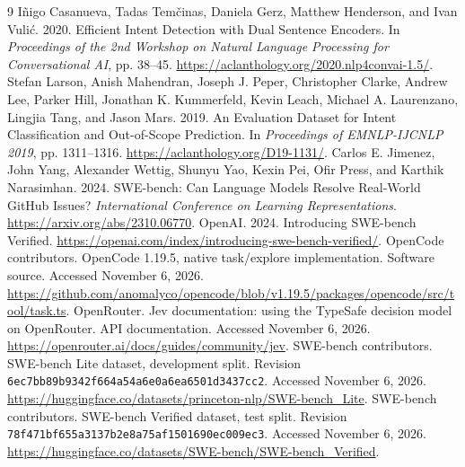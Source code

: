\documentclass{article}
\begin{document}
\clearpage
\begin{thebibliography}{9}
I\~nigo Casanueva, Tadas Tem\v{c}inas, Daniela Gerz, Matthew Henderson, and Ivan Vuli\'c. 2020. Efficient Intent Detection with Dual Sentence Encoders. In \emph{Proceedings of the 2nd Workshop on Natural Language Processing for Conversational AI}, pp. 38--45. \url{https://aclanthology.org/2020.nlp4convai-1.5/}.
Stefan Larson, Anish Mahendran, Joseph J. Peper, Christopher Clarke, Andrew Lee, Parker Hill, Jonathan K. Kummerfeld, Kevin Leach, Michael A. Laurenzano, Lingjia Tang, and Jason Mars. 2019. An Evaluation Dataset for Intent Classification and Out-of-Scope Prediction. In \emph{Proceedings of EMNLP-IJCNLP 2019}, pp. 1311--1316. \url{https://aclanthology.org/D19-1131/}.
Carlos E. Jimenez, John Yang, Alexander Wettig, Shunyu Yao, Kexin Pei, Ofir Press, and Karthik Narasimhan. 2024.
SWE-bench: Can Language Models Resolve Real-World GitHub Issues? \emph{International Conference on Learning Representations}. \url{https://arxiv.org/abs/2310.06770}.
OpenAI. 2024. Introducing SWE-bench Verified. \url{https://openai.com/index/introducing-swe-bench-verified/}.
OpenCode contributors. OpenCode 1.19.5, native task/explore implementation. Software source. Accessed November 6, 2026. \url{https://github.com/anomalyco/opencode/blob/v1.19.5/packages/opencode/src/tool/task.ts}.
OpenRouter. Jev documentation: using the TypeSafe decision model on OpenRouter. API documentation. Accessed November 6, 2026. \url{https://openrouter.ai/docs/guides/community/jev}.
SWE-bench contributors. SWE-bench Lite dataset, development split. Revision \texttt{6ec7bb89b9342f664a54a6e0a6ea6501d3437cc2}. Accessed November 6, 2026. \url{https://huggingface.co/datasets/princeton-nlp/SWE-bench_Lite}.
SWE-bench contributors. SWE-bench Verified dataset, test split. Revision \texttt{78f471bf655a3137b2e8a75af1501690ec009ec3}. Accessed November 6, 2026. \url{https://huggingface.co/datasets/SWE-bench/SWE-bench_Verified}.
\end{thebibliography}
\end{document}

